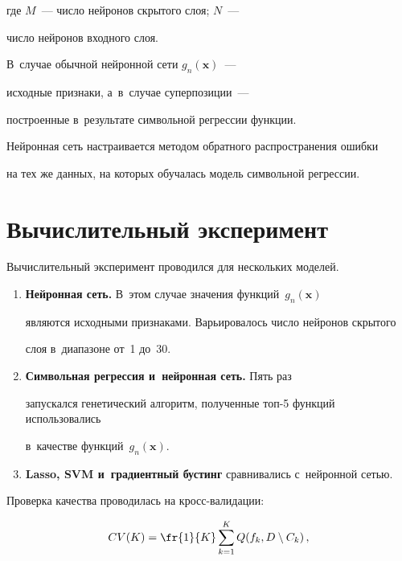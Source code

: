 где $M$~--- число нейронов скрытого слоя; $N$~---  

число нейронов входного слоя. 

В~случае обычной нейронной сети $g_n(\mathbf{x})$~--- 

исходные признаки, а~в~случае суперпозиции~--- 

построенные в~результате символьной регрессии функции.

Нейронная сеть настраивается методом обратного распространения ошибки 

на тех же данных, на которых обучалась модель символьной регрессии.



\section{Вычислительный эксперимент}



Вычислительный эксперимент проводился для нескольких моделей.

\begin{enumerate}

    \item \textbf{Нейронная сеть.} В~этом случае значения функций~$g_n(\mathbf{x})$ 

    являются исходными признаками. Варьировалось число нейронов скрытого 

    слоя в~диапазоне от~1 до~30.

    \item \textbf{Символьная регрессия и~нейронная сеть.} Пять раз 

    запускался генетический алгоритм, полученные топ-5 функций использовались 

    в~качестве функций~$g_n(\mathbf{x})$.

    \item \textbf{Lasso, SVM и~градиентный бустинг} сравнивались с~нейронной сетью.

\end{enumerate}



Проверка качества проводилась на кросс-ва\-ли\-да\-ции:

\begin{equation}

\label{cv}

CV(K) = \fr{1}{K}\sum\limits_{k=1}^{K} Q(f_k, D\setminus C_k)\,,

\end{equation}

